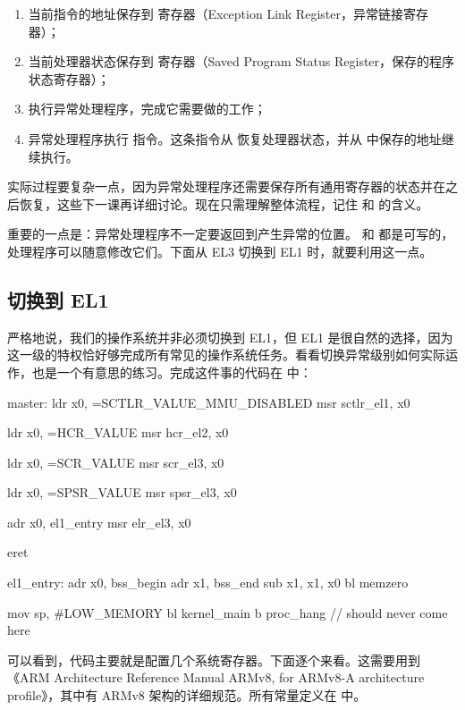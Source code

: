 \begin{enumerate}
  \item 当前指令的地址保存到  寄存器（Exception Link Register，异常链接寄存器）；
  \item 当前处理器状态保存到  寄存器（Saved Program Status Register，保存的程序状态寄存器）；
  \item 执行异常处理程序，完成它需要做的工作；
  \item 异常处理程序执行  指令。这条指令从  恢复处理器状态，并从  中保存的地址继续执行。
\end{enumerate}

实际过程要复杂一点，因为异常处理程序还需要保存所有通用寄存器的状态并在之后恢复，这些下一课再详细讨论。现在只需理解整体流程，记住  和  的含义。

重要的一点是：异常处理程序不一定要返回到产生异常的位置。 和  都是可写的，处理程序可以随意修改它们。下面从 EL3 切换到 EL1 时，就要利用这一点。

\subsection{切换到 EL1}

严格地说，我们的操作系统并非必须切换到 EL1，但 EL1 是很自然的选择，因为这一级的特权恰好够完成所有常见的操作系统任务。看看切换异常级别如何实际运作，也是一个有意思的练习。完成这件事的代码在  中：

\begin{asmcode}
master:
	ldr	x0, =SCTLR_VALUE_MMU_DISABLED
	msr	sctlr_el1, x0

	ldr	x0, =HCR_VALUE
	msr	hcr_el2, x0

	ldr	x0, =SCR_VALUE
	msr	scr_el3, x0

	ldr	x0, =SPSR_VALUE
	msr	spsr_el3, x0

	adr	x0, el1_entry
	msr	elr_el3, x0

	eret

el1_entry:
	adr	x0, bss_begin
	adr	x1, bss_end
	sub	x1, x1, x0
	bl 	memzero

	mov	sp, #LOW_MEMORY
	bl	kernel_main
	b 	proc_hang		// should never come here
\end{asmcode}

可以看到，代码主要就是配置几个系统寄存器。下面逐个来看。这需要用到《ARM Architecture Reference Manual ARMv8, for ARMv8-A architecture profile》\cite{armarm}，其中有 ARMv8 架构的详细规范。所有常量定义在  中。

